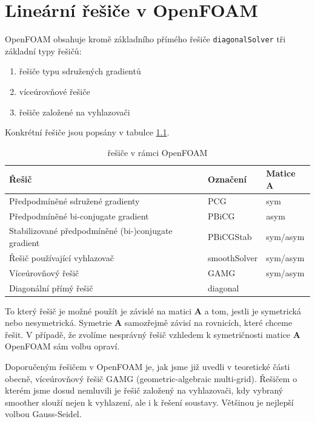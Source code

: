 \documentclass[a4paper,12pt]{report}
\theoremstyle{remark}
\begin{document}
	{\let\clearpage\relax \chapter{Lineární řešiče v OpenFOAM}}

OpenFOAM obsahuje kromě základního přímého řešiče \texttt{diagonalSolver} tři základní typy řešičů:
\begin{enumerate}
	\item řešiče typu sdružených gradientů 
	\item víceúrovňové řešiče
	\item řešiče založené na vyhlazovači

\end{enumerate}

Konkrétní řešiče jsou popsány v tabulce \ref{table:solvers}.

\begin{table}[H]
	\centering
	\caption{řešiče v rámci OpenFOAM}
	\renewcommand{\arraystretch}{1.7}
	\begin{tabular}{*3l}
		\toprule
		\textbf{Řešič} & \textbf{Označení}&\textbf{Matice $\boldsymbol{A}$}\\
		\midrule
		{\small Předpodmíněné sdružené gradienty}& PCG& sym\\
		{\small Předpodmíněné bi-conjugate gradient}& PBiCG&asym \\		
		{\small Stabilizované předpodmíněné (bi-)conjugate gradient}& PBiCGStab&sym/asym  \\
		{\small Řešič používající vyhlazovač}& smoothSolver&sym/asym \\
		{\small Víceúrovňový řešič}& GAMG&sym/asym  \\
		{\small Diagonální přímý řešič}& 	diagonal \\
	
		\bottomrule
	\end{tabular}
	
	\label{table:solvers}
\end{table}
		
To který řešič je možné použít je závislé na matici $\boldsymbol{A}$ a tom, jestli je symetrická nebo nesymetrická. Symetrie $\boldsymbol{A}$ samozřejmě závisí na rovnicích, které chceme řešit. V případě, že zvolíme nesprávný řešič vzhledem k symetričnosti matice $\boldsymbol{A}$ OpenFOAM sám volbu opraví.

Doporučeným řešičem v OpenFOAM je, jak jsme již uvedli v teoretické části obecně,  víceúrovňový řešič GAMG (geometric-algebraic multi-grid). Řešičem o kterém jsme dosud nemluvili je řešič založený na vyhlazovači, kdy vybraný smoother slouží nejen k vyhlazení, ale i k řešení soustavy.  Většinou je nejlepší volbou Gauss-Seidel.
\end{document}
